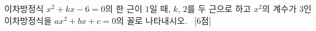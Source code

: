 이차방정식 $x^2+kx-6=0$의 한 근이 $1$일 때, $k$, $2$를 두 근으로 하고 $x^2$의 계수가 $3$인 이차방정식을 $ax^2+bx+c=0$의 꼴로 나타내시오. ~\mbox{\mbox{[6점]}}
